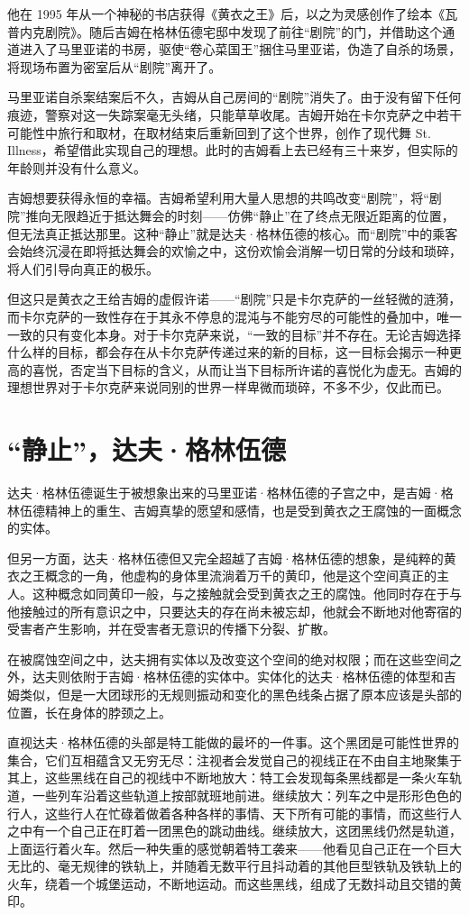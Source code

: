 他在 1995 年从一个神秘的书店获得《黄衣之王》后，以之为灵感创作了绘本《瓦普内克剧院》。随后吉姆在格林伍德宅邸中发现了前往“剧院”的门，并借助这个通道进入了马里亚诺的书房，驱使“卷心菜国王”捆住马里亚诺，伪造了自杀的场景，将现场布置为密室后从“剧院”离开了。

马里亚诺自杀案结案后不久，吉姆从自己房间的“剧院”消失了。由于没有留下任何痕迹，警察对这一失踪案毫无头绪，只能草草收尾。吉姆开始在卡尔克萨之中若干可能性中旅行和取材，在取材结束后重新回到了这个世界，创作了现代舞 St. Illness，希望借此实现自己的理想。此时的吉姆看上去已经有三十来岁，但实际的年龄则并没有什么意义。

吉姆想要获得永恒的幸福。吉姆希望利用大量人思想的共鸣改变“剧院”，将“剧院”推向无限趋近于抵达舞会的时刻——仿佛“静止”在了终点无限近距离的位置，但无法真正抵达那里。这种“静止”就是达夫·格林伍德的核心。而“剧院”中的乘客会始终沉浸在即将抵达舞会的欢愉之中，这份欢愉会消解一切日常的分歧和琐碎，将人们引导向真正的极乐。

但这只是黄衣之王给吉姆的虚假许诺——“剧院”只是卡尔克萨的一丝轻微的涟漪，而卡尔克萨的一致性存在于其永不停息的混沌与不能穷尽的可能性的叠加中，唯一一致的只有变化本身。对于卡尔克萨来说，“一致的目标”并不存在。无论吉姆选择什么样的目标，都会存在从卡尔克萨传递过来的新的目标，这一目标会揭示一种更高的喜悦，否定当下目标的含义，从而让当下目标所许诺的喜悦化为虚无。吉姆的理想世界对于卡尔克萨来说同别的世界一样卑微而琐碎，不多不少，仅此而已。

\section{“静止”，达夫·格林伍德}

达夫·格林伍德诞生于被想象出来的马里亚诺·格林伍德的子宫之中，是吉姆·格林伍德精神上的重生、吉姆真挚的愿望和感情，也是受到黄衣之王腐蚀的一面概念的实体。

但另一方面，达夫·格林伍德但又完全超越了吉姆·格林伍德的想象，是纯粹的黄衣之王概念的一角，他虚构的身体里流淌着万千的黄印，他是这个空间真正的主人。这种概念如同黄印一般，与之接触就会受到黄衣之王的腐蚀。他同时存在于与他接触过的所有意识之中，只要达夫的存在尚未被忘却，他就会不断地对他寄宿的受害者产生影响，并在受害者无意识的传播下分裂、扩散。

在被腐蚀空间之中，达夫拥有实体以及改变这个空间的绝对权限；而在这些空间之外，达夫则依附于吉姆·格林伍德的实体中。实体化的达夫·格林伍德的体型和吉姆类似，但是一大团球形的无规则振动和变化的黑色线条占据了原本应该是头部的位置，长在身体的脖颈之上。

直视达夫·格林伍德的头部是特工能做的最坏的一件事。这个黑团是可能性世界的集合，它们互相蕴含又无穷无尽：注视者会发觉自己的视线正在不由自主地聚集于其上，这些黑线在自己的视线中不断地放大：特工会发现每条黑线都是一条火车轨道，一些列车沿着这些轨道上按部就班地前进。继续放大：列车之中是形形色色的行人，这些行人在忙碌着做着各种各样的事情、天下所有可能的事情，而这些行人之中有一个自己正在盯着一团黑色的跳动曲线。继续放大，这团黑线仍然是轨道，上面运行着火车。然后一种失重的感觉朝着特工袭来——他看见自己正在一个巨大无比的、毫无规律的铁轨上，并随着无数平行且抖动着的其他巨型铁轨及铁轨上的火车，绕着一个城堡运动，不断地运动。而这些黑线，组成了无数抖动且交错的黄印。

